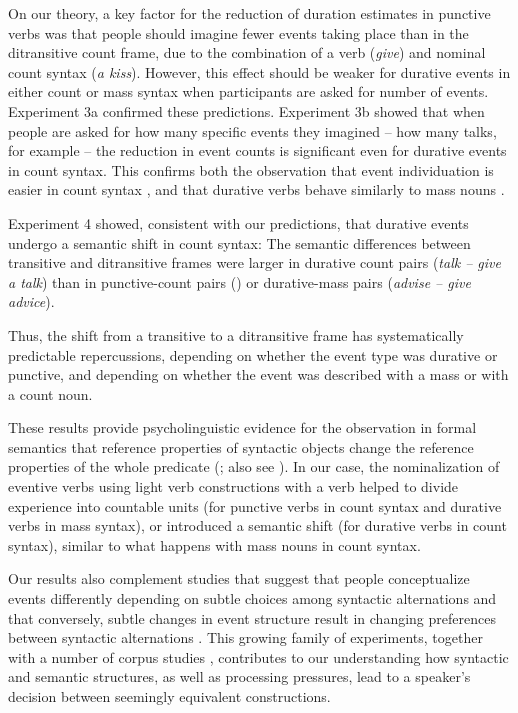 \documentclass[preprint,12pt,authoryear]{elsarticle}
\begin{document}
On our theory, a key factor for the reduction of duration estimates in punctive verbs was that people should imagine fewer events taking place than in the ditransitive count frame, due to the combination of a  verb (\emph{give}) and nominal count syntax (\emph{a kiss}). However, this effect should be weaker for durative events in either count or mass syntax when participants are asked for number of events. Experiment 3a confirmed these predictions. Experiment 3b showed that when people are asked for how many specific events they imagined -- how many talks, for example -- the reduction in event counts is significant even for durative events in count syntax. This confirms both the observation that event individuation is easier in count syntax \citep{barner2008events}, and that durative verbs behave similarly to mass nouns \citep{Krifka1992}.

Experiment 4 showed, consistent with our predictions, that durative events undergo a semantic shift in count syntax: The semantic differences between transitive and ditransitive frames were larger in durative count pairs (\emph{talk -- give a talk}) than in punctive-count pairs () or durative-mass pairs (\emph{advise -- give advice}). 

Thus, the shift from a transitive to a ditransitive frame has systematically predictable repercussions, depending on whether the event type was durative or punctive, and depending on whether the event was described with a mass or with a count noun. 

These results provide psycholinguistic evidence for the observation in formal semantics that reference properties of syntactic objects change the reference properties of the whole predicate (\cite{Krifka1992}; also see \cite{quine1969,verkuyl1972compositional}). In our case, the nominalization of eventive verbs using light verb constructions with a  verb helped to divide experience into countable units (for punctive verbs in count syntax and durative verbs in mass syntax), or introduced a semantic shift (for durative verbs in count syntax), similar to what happens with mass nouns in count syntax.

Our results also complement studies that suggest that people conceptualize events differently depending on subtle choices among syntactic alternations \citep{fausey2010,JohnsonGoldberg2013,wittenberg2014sorting} and that conversely, subtle changes in event structure result in changing preferences between syntactic alternations \citep{gropen1991}. This growing family of experiments, together with a  number of corpus studies \citep{bresnan2007,benor2006chicken}, contributes to our understanding how syntactic and semantic structures, as well as processing pressures, lead to a speaker's decision between  seemingly equivalent constructions.
\end{document}
